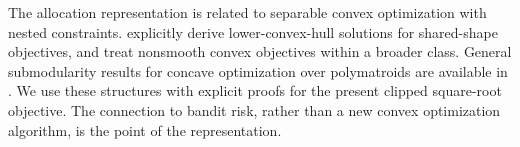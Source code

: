 The allocation representation is related to separable convex optimization with nested constraints. \citet{vidal2016nested} explicitly derive lower-convex-hull solutions for shared-shape objectives, and \citet{vidal2019separable} treat nonsmooth convex objectives within a broader class. General submodularity results for concave optimization over polymatroids are available in \citet{he2012polymatroid}. We use these structures with explicit proofs for the present clipped square-root objective. The connection to bandit risk, rather than a new convex optimization algorithm, is the point of the representation.
